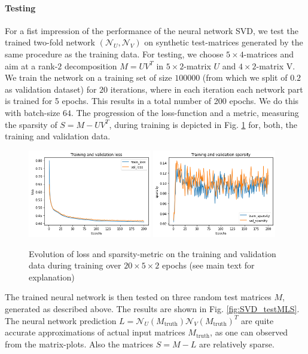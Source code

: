 \paragraph{Testing}
For a fist impression of the performance of the neural network SVD, we test the trained two-fold network $(\mathcal{N}_U,\mathcal{N}_V)$ on synthetic test-matrices generated by the same procedure as the training data. For testing, we choose $5\times 4$-matrices and aim at a rank-$2$ decomposition $M = UV^T$ in $5\times 2$-matrix $U$ and $4\times 2$-matrix V. We train the network on a training set of size $100000$ (from which we split of $0.2$ as validation dataset) for $20$ iterations, where in each iteration each network part is trained for 5 epochs. This results in a total number of 200 epochs. We do this with batch-size $64$. The progression of the loss-function and a metric, measuring the sparsity of $S = M - UV^T$, during training is depicted in Fig. \ref{fig:SVD_training_loss_sparsity} for, both, the training and validation data.
\begin{figure}
\centering
\includegraphics[width=0.48\textwidth]{fig/loss_SVD_[5,4]_k2.png}
\includegraphics[width=0.48\textwidth]{fig/sparsity_SVD_[5,4]_k2.png}
\caption{Evolution of loss and sparsity-metric on the training and validation data during training over $20\times 5\times 2$ epochs (see main text for explanation)}
\label{fig:SVD_training_loss_sparsity}
\end{figure}
The trained neural network is then tested on three random test matrices $M$, generated as described above. The results are shown in Fig. \ref{fig:SVD_testMLS}. The neural network prediction $L = \mathcal{N}_U(M_\text{truth})\mathcal{N}_V(M_\text{truth})^T$ are quite accurate approximations of actual input matrices $M_\text{truth}$, as one can observed from the matrix-plots. Also the matrices $S = M -L$ are relatively sparse.
